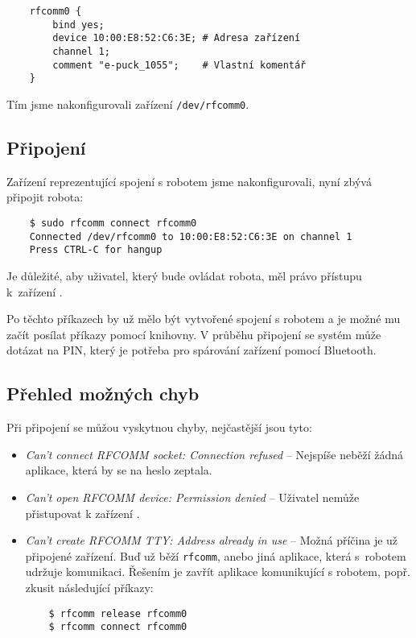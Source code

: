    \begin{verbatim}
    rfcomm0 {
        bind yes;
        device 10:00:E8:52:C6:3E; # Adresa zařízení
        channel 1;
        comment "e-puck_1055";    # Vlastní komentář
    }
    \end{verbatim}

    Tím jsme nakonfigurovali zařízení {\tt /dev/rfcomm0}.

    \subsection{Připojení}

    Zařízení reprezentující spojení s robotem jsme nakonfigurovali, nyní zbývá
    připojit robota:

    \begin{verbatim}
    $ sudo rfcomm connect rfcomm0
    Connected /dev/rfcomm0 to 10:00:E8:52:C6:3E on channel 1
    Press CTRL-C for hangup
    \end{verbatim}

    Je důležité, aby uživatel, který bude ovládat robota, měl právo přístupu
    k~zařízení .

    Po těchto příkazech by už mělo být vytvořené spojení s robotem a je možné
    mu začít posílat příkazy pomocí knihovny. V průběhu připojení se systém
    může dotázat na PIN, který je potřeba pro spárování zařízení pomocí
    Bluetooth.

    \subsection{Přehled možných chyb}
    Při připojení se můžou vyskytnou chyby, nejčastější jsou tyto:
    \begin{itemize}
    \item{{\em Can't connect RFCOMM socket: Connection refused} -- Nejspíše
        neběží žádná aplikace, která by se na heslo zeptala.}
    \item{{\em Can't open RFCOMM device: Permission denied} -- Uživatel nemůže
        přistupovat k zařízení .}
    \item{{\em Can't create RFCOMM TTY: Address already in use} -- Možná
        příčina je už připojené zařízení. Buď už běží {\tt rfcomm}, anebo jiná
        aplikace, která s~robotem udržuje komunikaci. Řešením je zavřít
        aplikace komunikující s robotem, popř. zkusit následující příkazy:
    \begin{verbatim}
    $ rfcomm release rfcomm0
    $ rfcomm connect rfcomm0
    \end{verbatim}
    }
    \end{itemize}

